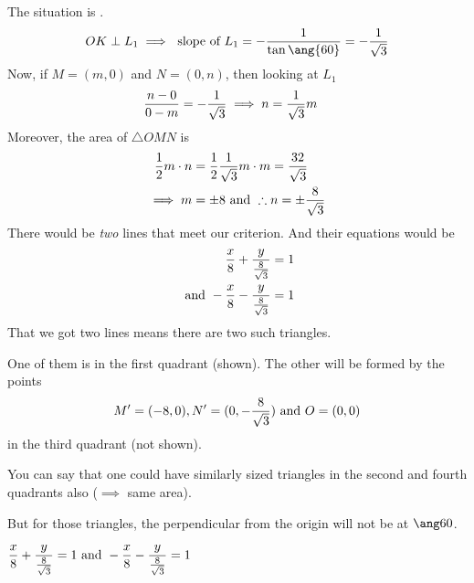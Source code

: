 \begin{solution}[\halfpage]
	The situation is \asif. 
  \[ OK \perp L_1 \implies\text{ slope of }L_1 = -\dfrac{1}{\tan\ang{\vd}} = -\vb \]
	Now, if $M = (m,0)$ and $N = (0,n)$, then looking at $L_1$
	\begin{align}
		\dfrac{n-0}{0-m} &= -\dfrac{1}{\sqrt{3}} \implies n = \dfrac{1}{\sqrt{3}} m
	\end{align}
	Moreover, the area of $\triangle OMN$ is 
	\begin{align}
		\dfrac{1}{2}m\cdot n &= \dfrac{1}{2}\dfrac{1}{\sqrt{3}} m\cdot m = \dfrac{32}{\sqrt{3}} \\
		\implies m &= \pm8 \text{ and } \therefore n = \pm\frac{8}{\sqrt{3}}
	\end{align}
	There would be \textit{two} lines that meet our criterion. And their equations would be 
	\begin{align}
		\dfrac{x}{8} + \dfrac{y}{\frac{8}{\sqrt{3}}} &= 1 \\
		\text{ and } -\dfrac{x}{8} - \dfrac{y}{\frac{8}{\sqrt{3}}} &= 1
  \end{align}
  That we got two lines means there are two such triangles. 

  One of them is in the first quadrant (shown). The other will be formed by the points 
  \[ M'=(-8,0), N'=(0,-\frac{8}{\sqrt{3}})\text{ and } O = (0,0) \] 
  in the third quadrant (not shown). 

  You can say that one could have similarly sized triangles in the second and fourth 
  quadrants also ($\implies$ same area).

  But for those triangles, the perpendicular from the origin will not be at $\ang\vd$.
\end{solution}

\ifprintanswers\begin{codex}
  $\dfrac{x}{8} + \dfrac{y}{\frac{8}{\sqrt{3}}} = 1\text{ and }
  -\dfrac{x}{8} - \dfrac{y}{\frac{8}{\sqrt{3}}} = 1$
\end{codex}\fi

